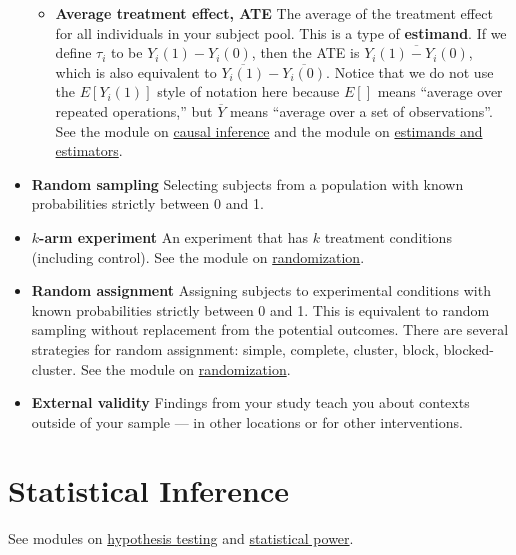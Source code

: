 \documentclass[12pt,]{book}
\providecommand{\tightlist}{%
  \setlength{\itemsep}{0pt}\setlength{\parskip}{0pt}}
\begin{document}
\begin{itemize}
  \begin{itemize}
  \tightlist
  \item
    \textbf{Average treatment effect, ATE} The average of the treatment effect for all individuals in your subject pool. This is a type of \textbf{estimand}. If we define \(\tau_i\) to be \(Y_i(1)-Y_i(0)\), then the ATE is \(\overline{Y_i(1)-Y_i(0)}\), which is also equivalent to \(\overline{{Y}_i(1)}-\overline{{Y}_i(0)}\). Notice that we do not use the \(E[Y_i (1)]\) style of notation here because \(E[]\) means ``average over repeated operations,'' but \(\overline{Y}\) means ``average over a set of observations''. See the module on \href{causal-inference.html}{causal inference} and the module on \href{estimands-and-estimators.html}{estimands and estimators}.
  \end{itemize}
\item
  \textbf{Random sampling} Selecting subjects from a population with known
  probabilities strictly between 0 and 1.
\item
  \textbf{\(k\)-arm experiment} An experiment that has \(k\) treatment conditions
  (including control). See the module on \href{randomization.html}{randomization}.
\item
  \textbf{Random assignment} Assigning subjects to experimental conditions with known probabilities strictly between 0 and 1. This is equivalent to random sampling without replacement from the potential outcomes. There are several strategies for random assignment: simple, complete, cluster, block, blocked-cluster. See the module on \href{randomization.html}{randomization}.
\item
  \textbf{External validity} Findings from your study teach you about contexts outside of your sample --- in other locations or for other interventions.
\end{itemize}

\hypertarget{statistical-inference}{%
\section{Statistical Inference}\label{statistical-inference}}

See modules on \href{hypothesis-testing.html}{hypothesis testing} and \href{statistical-power-and-design-diagnosands.html}{statistical power}.
\end{document}
